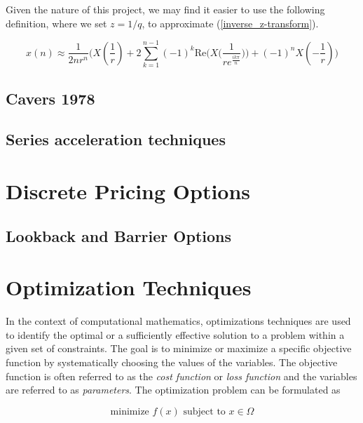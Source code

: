 \documentclass[a4paper]{report}
\begin{document}
Given the nature of this project, we may find it easier to use the following definition, where we set $z = 1 / q$, to approximate (\ref{inverse_z-transform}).

\begin{equation}\label{aw_inversion}
	x(n) \approx \frac{1}{2nr^n} \biggr( X(\frac{1}{r}) + 2\sum^{n-1}_{k = 1} (-1)^k \text{Re}\bigg( X\big(\frac{1}{re^{\frac{ik\pi}{n}}}\big)\bigg) + (-1)^nX(-\frac{1}{r}) \biggl)
\end{equation}

\subsection{Cavers 1978}

\subsection{Series acceleration techniques}

\section{Discrete Pricing Options}

\subsection{Lookback and Barrier Options}

\section{Optimization Techniques}
In the context of computational mathematics, optimizations techniques are used to identify the optimal or a sufficiently effective solution to a problem within a given set of constraints. The goal is to minimize or maximize a specific objective function by systematically choosing the values of the variables. The objective function is often referred to as the \textit{cost function} or \textit{loss function} and the variables are referred to as \textit{parameters}. The optimization problem can be formulated as

\begin{equation}\label{optimization_problem}
	\text{minimize } f(x) \text{ subject to } x \in \Omega
\end{equation}
\end{document}
